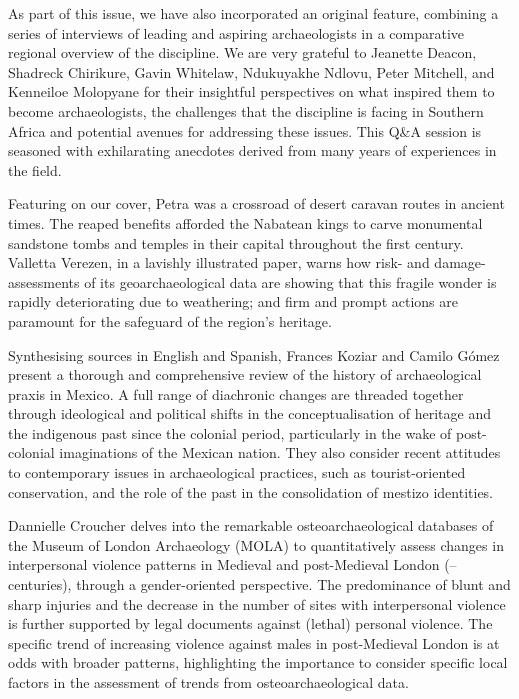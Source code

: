 As part of this issue, we have also incorporated an original feature, combining a series of interviews of leading and aspiring archaeologists in a comparative regional overview of the discipline. We are very grateful to Jeanette Deacon, Shadreck Chirikure, Gavin Whitelaw, Ndukuyakhe Ndlovu, Peter Mitchell, and Kenneiloe Molopyane for their insightful perspectives on what inspired them to become archaeologists, the challenges that the discipline is facing in Southern Africa and potential avenues for addressing these issues. This Q\&A session is seasoned with exhilarating anecdotes derived from many years of experiences in the field.

Featuring on our cover, Petra was a crossroad of desert caravan routes in ancient times. The reaped benefits afforded the Nabatean kings to carve monumental sandstone tombs and temples in their capital throughout the first century\BC. Valletta Verezen, in a lavishly illustrated paper, warns how risk- and damage-assessments of its geoarchaeological data are showing that this fragile wonder is rapidly deteriorating due to weathering; and firm and prompt actions are paramount for the safeguard of the region’s heritage.

Synthesising sources in English and Spanish, Frances Koziar and Camilo Gómez present a thorough and comprehensive review of the history of archaeological praxis in Mexico. A full range of diachronic changes are threaded together through ideological and political shifts in the conceptualisation of heritage and the indigenous past since the colonial period, particularly in the wake of post-colonial imaginations of the Mexican nation. They also consider recent attitudes to contemporary issues in archaeological practices, such as tourist-oriented conservation, and the role of the past in the consolidation of mestizo identities.

Dannielle Croucher delves into the remarkable osteoarchaeological databases of the Museum of London Archaeology (MOLA) to quantitatively assess changes in interpersonal violence patterns in Medieval and post-Medieval London (-- centuries), through a gender-oriented perspective. The predominance of blunt and sharp injuries and the decrease in the number of sites with interpersonal violence is further supported by legal documents against (lethal) personal violence. The specific trend of increasing violence against males in post-Medieval London is at odds with broader patterns, highlighting the importance to consider specific local factors in the assessment of trends from osteoarchaeological data.

